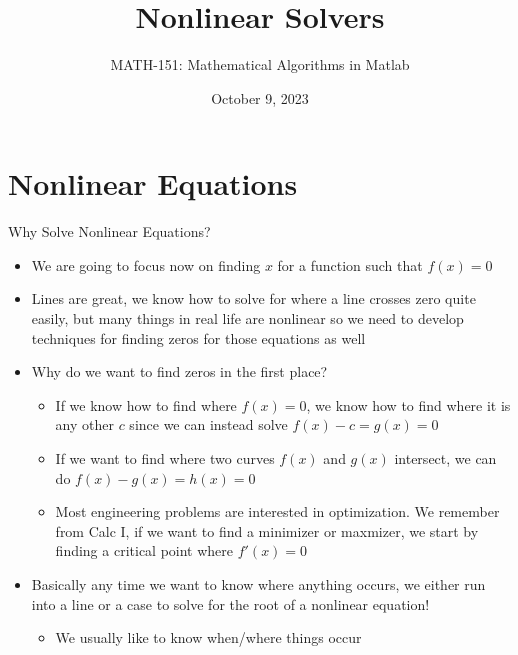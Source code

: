 {}\documentclass[letterpaper,
compress,
xcolor=x11names,
]{beamer}
\begin{document}
	\title{Nonlinear Solvers}
	\author{MATH-151:  Mathematical Algorithms in Matlab}
	\date[202X]{October 9, 2023}




\begin{frame}
\titlepage
\end{frame}
\section{Nonlinear Equations}

\begin{frame}{Why Solve Nonlinear Equations?}
	\footnotesize
	\begin{itemize}
		\item We are going to focus now on finding $x$ for a function such that $f(x) = 0$
		\item Lines are great, we know how to solve for where a line crosses zero quite easily, but many things in real life are nonlinear so we need to develop techniques for finding zeros for those equations as well
		\item<2-> Why do we want to find zeros in the first place?
		\begin{itemize}
			\item<3-> If we know how to find where $f(x)=0$, we know how to find where it is any other $c$ since we can instead solve $f(x) - c = g(x) = 0$
			\item<3-> If we want to find where two curves $f(x)$ and $g(x)$ intersect, we can do $f(x) - g(x) = h(x) = 0$
			\item<3-> Most engineering problems are interested in optimization. We remember from Calc I, if we want to find a minimizer or maxmizer, we start by finding a critical point where $f'(x) = 0$
		\end{itemize}
		\item<4-> Basically any time we want to know where anything occurs, we either run into a line or a case to solve for the root of a nonlinear equation!
		\begin{itemize}
			\item We usually like to know when/where things occur
		\end{itemize}
	\end{itemize}
\end{frame}
\end{document}
